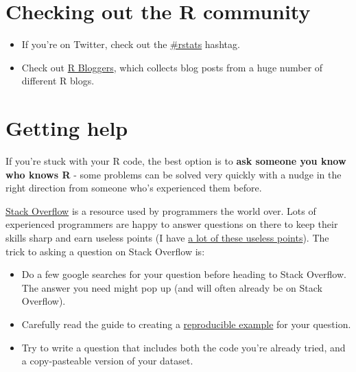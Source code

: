 \documentclass[
]{book}
\providecommand{\tightlist}{%
  \setlength{\itemsep}{0pt}\setlength{\parskip}{0pt}}
\begin{document}
\hypertarget{checking-out-the-r-community}{%
\section*{Checking out the R community}\label{checking-out-the-r-community}}

\begin{itemize}
\tightlist
\item
  If you're on Twitter, check out the \href{https://twitter.com/hashtag/rstats}{\#rstats}
  hashtag.
\item
  Check out \href{https://www.r-bloggers.com/}{R Bloggers}, which collects blog posts
  from a huge number of different R blogs.
\end{itemize}

\hypertarget{getting-help}{%
\section*{Getting help}\label{getting-help}}

If you're stuck with your R code, the best option is to \textbf{ask someone you know
who knows R} - some problems can be solved very quickly with a nudge in
the right direction from someone who's experienced them before.

\href{https://stackoverflow.com/}{Stack Overflow} is a resource used by programmers
the world over. Lots of experienced programmers are happy to answer questions
on there to keep their skills sharp and earn useless points
(I have \href{https://stackoverflow.com/users/1222578/marius}{a lot of these useless points}).
The trick to asking a question on Stack Overflow is:

\begin{itemize}
\tightlist
\item
  Do a few google searches for your question before heading to Stack Overflow. The
  answer you need might pop up (and will often already be on Stack Overflow).
\item
  Carefully read the guide to creating a
  \href{https://stackoverflow.com/questions/5963269/how-to-make-a-great-r-reproducible-example}{reproducible example}
  for your question.
\item
  Try to write a question that includes both the code you're already tried, and a
  copy-pasteable version of your dataset.
\end{itemize}
\end{document}
